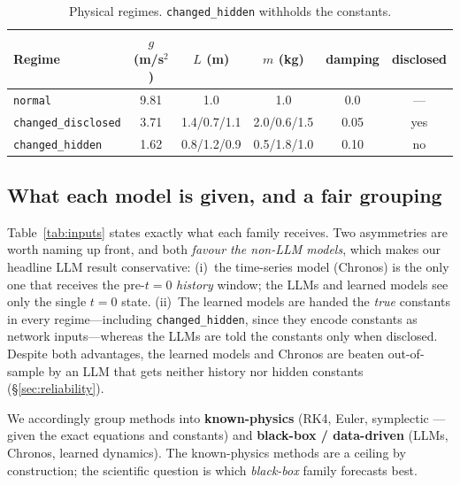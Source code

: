 \documentclass{article}
\begin{document}
\begin{table}[t]
\centering\small
\caption{Physical regimes. \texttt{changed\_hidden} withholds the constants.}
\label{tab:regimes}
\begin{tabular}{lccccc}
\toprule
Regime & $g$ (m/s$^2$) & $L$ (m) & $m$ (kg) & damping & disclosed \\
\midrule
\texttt{normal} & 9.81 & 1.0 & 1.0 & 0.0 & --- \\
\texttt{changed\_disclosed} & 3.71 & 1.4/0.7/1.1 & 2.0/0.6/1.5 & 0.05 & yes \\
\texttt{changed\_hidden} & 1.62 & 0.8/1.2/0.9 & 0.5/1.8/1.0 & 0.10 & no \\
\bottomrule
\end{tabular}
\end{table}

\subsection{What each model is given, and a fair grouping}
\label{sec:inputs}
Table~\ref{tab:inputs} states exactly what each family receives. Two asymmetries are
worth naming up front, and both \emph{favour the non-LLM models}, which makes our
headline LLM result conservative: (i)~the time-series model (Chronos) is the only one
that receives the pre-$t{=}0$ \emph{history} window; the LLMs and learned models see
only the single $t{=}0$ state. (ii)~The learned models are handed the \emph{true}
constants in every regime---including \texttt{changed\_hidden}, since they encode
constants as network inputs---whereas the LLMs are told the constants only when
disclosed. Despite both advantages, the learned models and Chronos are beaten
out-of-sample by an LLM that gets neither history nor hidden constants
(\S\ref{sec:reliability}).

We accordingly group methods into \textbf{known-physics} (RK4, Euler, symplectic ---
given the exact equations and constants) and \textbf{black-box / data-driven} (LLMs,
Chronos, learned dynamics). The known-physics methods are a ceiling by construction;
the scientific question is which \emph{black-box} family forecasts best.
\end{document}
